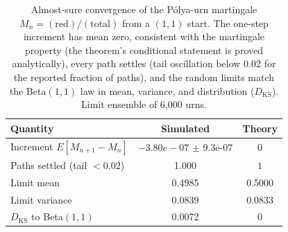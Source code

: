 \begin{table}[h]
\centering
\caption{Almost-sure convergence of the P\'olya-urn martingale $M_n = (\text{red})/(\text{total})$ from a $(1,1)$ start. The one-step increment has mean zero, consistent with the martingale property (the theorem's conditional statement is proved analytically), every path settles (tail oscillation below 0.02 for the reported fraction of paths), and the random limits match the Beta$(1,1)$ law in mean, variance, and distribution ($D_{\mathrm{KS}}$). Limit ensemble of 6{,}000 urns.}
\label{tab:prelim_martingale}
\begin{tabular}{lcc}
\hline
Quantity & Simulated & Theory \\
\hline
Increment $E[M_{n+1}-M_n]$ & $-3.80e-07$ $\pm$ 9.3e-07 & $0$ \\
Paths settled (tail $< 0.02$) & 1.000 & $1$ \\
Limit mean & 0.4985 & 0.5000 \\
Limit variance & 0.0839 & 0.0833 \\
$D_{\mathrm{KS}}$ to Beta$(1,1)$ & 0.0072 & $0$ \\
\hline
\end{tabular}
\end{table}
